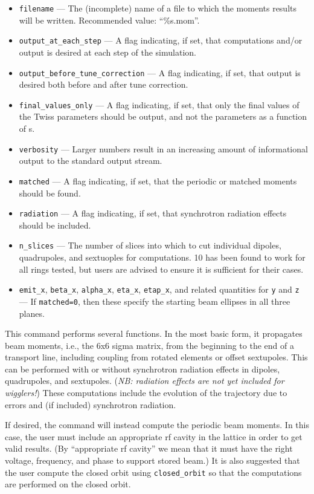 \documentclass[11pt]{article}
\begin{document}
\begin{itemize}
\item \verb|filename| --- The (incomplete) name of a file to which the moments results will be written.
  Recommended value: ``\%s.mom''.
\item \verb|output_at_each_step| --- A flag indicating, if set, that computations and/or output is desired at each step of the simulation.
\item \verb|output_before_tune_correction| --- A flag indicating, if set, that output is desired both before and after
tune correction.
\item \verb|final_values_only| --- A flag indicating, if set, that only the final values of the Twiss parameters should
be output, and not the parameters as a function of s.
\item \verb|verbosity| --- Larger numbers result in an increasing amount of informational output to the standard output stream.
\item \verb|matched| --- A flag indicating, if set, that the periodic or matched moments should be found.
\item \verb|radiation| --- A flag indicating, if set, that synchrotron radiation effects should be included.
\item \verb|n_slices| --- The number of slices into which to cut individual dipoles, quadrupoles, and sextuoples for computations.
  10 has been found to work for all rings tested, but users are advised to ensure it is sufficient for their cases.
\item \verb|emit_x|, \verb|beta_x|, \verb|alpha_x|, \verb|eta_x|, \verb|etap_x|, and related quantities for \verb|y| and \verb|z| ---
  If \verb|matched=0|, then these specify the starting beam ellipses in all three planes.
\end{itemize}

This command performs several functions.  In the most basic form, it
propagates beam moments, i.e., the 6x6 sigma matrix, from the
beginning to the end of a transport line, including coupling from
rotated elements or offset sextupoles. This can be performed with or
without synchrotron radiation effects in dipoles, quadrupoles, and sextupoles.
({\em NB: radiation effects are not yet included for wigglers!})  These computations
include the evolution of the trajectory due to errors and (if included)
synchrotron radiation.

If desired, the command will instead compute the periodic beam
moments.  In this case, the user must include an appropriate rf cavity
in the lattice in order to get valid results.  (By ``appropriate rf
cavity'' we mean that it must have the right voltage, frequency, and
phase to support stored beam.)  It is also suggested that the user
compute the closed orbit using \verb|closed_orbit| so that the
computations are performed on the closed orbit.
\end{document}
